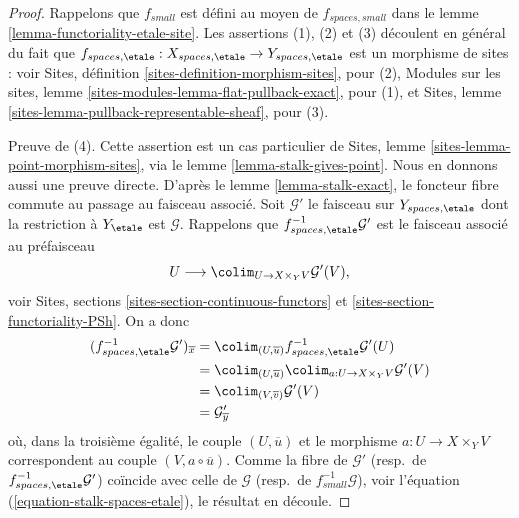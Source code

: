 \begin{proof}
Rappelons que $f_{small}$ est défini au moyen de $f_{spaces, small}$ dans le
lemme \ref{lemma-functoriality-etale-site}.
Les assertions (1), (2) et (3) découlent en général du fait que
$f_{spaces, \etale} :
X_{spaces, \etale}
\to
Y_{spaces, \etale}$
est un morphisme de sites : voir
Sites, définition \ref{sites-definition-morphism-sites},
pour (2),
Modules sur les sites, lemme \ref{sites-modules-lemma-flat-pullback-exact},
pour (1), et
Sites, lemme \ref{sites-lemma-pullback-representable-sheaf},
pour (3).

\medskip\noindent
Preuve de (4). Cette assertion est un cas particulier de
Sites, lemme \ref{sites-lemma-point-morphism-sites},
via le
lemme \ref{lemma-stalk-gives-point}.
Nous en donnons aussi une preuve directe. D'après le
lemme \ref{lemma-stalk-exact},
le foncteur fibre commute au passage au faisceau associé.
Soit $\mathcal{G}'$ le faisceau sur $Y_{spaces, \etale}$ dont la restriction
à $Y_\etale$ est $\mathcal{G}$.
Rappelons que $f_{spaces, \etale}^{-1}\mathcal{G}'$ est le faisceau
associé au préfaisceau
$$
U \longrightarrow \colim_{U \to X \times_Y V} \mathcal{G}'(V),
$$
voir
Sites, sections \ref{sites-section-continuous-functors} et
\ref{sites-section-functoriality-PSh}.
On a donc
\begin{align*}
(f_{spaces, \etale}^{-1}\mathcal{G}')_{\overline{x}}
& =
\colim_{(U, \overline{u})} f_{spaces, \etale}^{-1}\mathcal{G}'(U)
\\
& = \colim_{(U, \overline{u})}
\colim_{a : U \to X \times_Y V} \mathcal{G}'(V) \\
& = \colim_{(V, \overline{v})} \mathcal{G}'(V) \\
& = \mathcal{G}'_{\overline{y}}
\end{align*}
où, dans la troisième égalité, le couple $(U, \overline{u})$ et le morphisme
$a : U \to X \times_Y V$ correspondent au couple $(V, a \circ \overline{u})$.
Comme la fibre de $\mathcal{G}'$
(resp.\ de $f_{spaces, \etale}^{-1}\mathcal{G}'$)
coïncide avec celle de $\mathcal{G}$ (resp.\ de $f_{small}^{-1}\mathcal{G}$),
voir
l'équation (\ref{equation-stalk-spaces-etale}),
le résultat en découle.
\end{proof}

